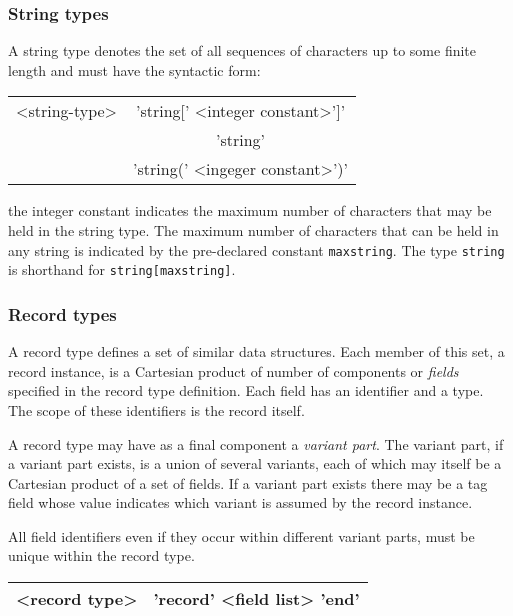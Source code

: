 \subsubsection{String types}

A string type denotes the set of all sequences of characters
up to some finite length and must have the syntactic form:

\vspace{0.3cm}
{\centering \begin{tabular}{|c|c|}
\hline 
<string-type>&
'string{[}' <integer constant>'{]}'\\
&
'string'\\
&'string{(}' <ingeger constant>'{)}'\\
\hline 
\end{tabular}\par}
\vspace{0.3cm}

the integer constant indicates the maximum number of characters that may be
held in the string type. The maximum number of characters that can be held in
any string is indicated by the pre-declared constant \texttt{maxstring}. The
type \texttt{string} is shorthand for \texttt{string{[}maxstring{]}}.


\subsubsection{Record types}

A record type defines a set of similar data structures. Each member of this
set, a record instance, is a Cartesian product of number of components or \emph{fields}
specified in the record type definition. Each field has an identifier
and a type. The scope of these identifiers is the record itself.

A record type may have as a final component a \emph{variant
part}. The variant part, if a variant part exists, is a union of several variants,
each of which may itself be a Cartesian product of a set of fields. If a variant
part exists there may be a tag field whose value indicates which variant is
assumed by the record instance.

All field identifiers even if they occur within different variant parts, must
be unique within the record type.

\vspace{0.3cm}
{\centering \begin{tabular}{|c|c|}
\hline 
<record type>&
'record' <field list> 'end'\\
\hline 
\end{tabular}\par}
\vspace{0.3cm}

